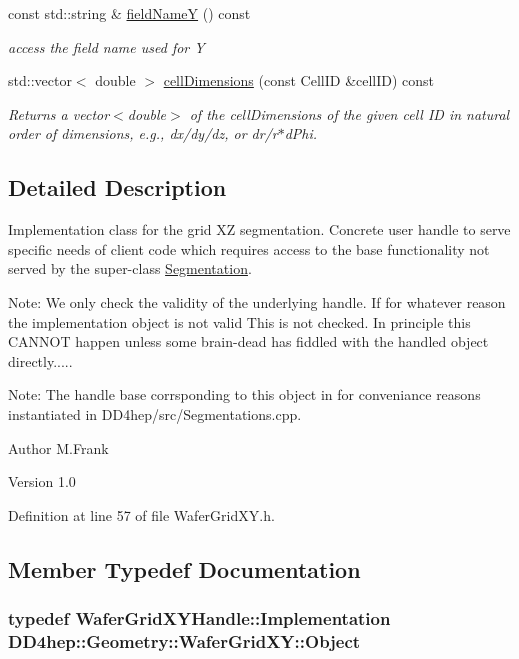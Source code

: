\begin{DoxyCompactItemize}
const std::string \& \hyperlink{class_d_d4hep_1_1_geometry_1_1_wafer_grid_x_y_a05aa07ed5eb1190b85a79d8cc27f8e89}{fieldNameY} () const 
\begin{DoxyCompactList}\small\item\em access the field name used for Y \item\end{DoxyCompactList}\item 
std::vector$<$ double $>$ \hyperlink{class_d_d4hep_1_1_geometry_1_1_wafer_grid_x_y_a6a03248b55e4fb3c5efd567b89c936cb}{cellDimensions} (const CellID \&cellID) const 
\begin{DoxyCompactList}\small\item\em Returns a vector$<$double$>$ of the cellDimensions of the given cell ID in natural order of dimensions, e.g., dx/dy/dz, or dr/r$\ast$dPhi. \item\end{DoxyCompactList}\end{DoxyCompactItemize}


\subsection{Detailed Description}
Implementation class for the grid XZ segmentation. Concrete user handle to serve specific needs of client code which requires access to the base functionality not served by the super-\/class \hyperlink{class_d_d4hep_1_1_geometry_1_1_segmentation}{Segmentation}.

Note: We only check the validity of the underlying handle. If for whatever reason the implementation object is not valid This is not checked. In principle this CANNOT happen unless some brain-\/dead has fiddled with the handled object directly.....

Note: The handle base corrsponding to this object in for conveniance reasons instantiated in DD4hep/src/Segmentations.cpp.

\begin{DoxyAuthor}{Author}
M.Frank 
\end{DoxyAuthor}
\begin{DoxyVersion}{Version}
1.0 
\end{DoxyVersion}


Definition at line 57 of file WaferGridXY.h.

\subsection{Member Typedef Documentation}
\hypertarget{class_d_d4hep_1_1_geometry_1_1_wafer_grid_x_y_a94a234312cc2c123569319d3d33b24e0}{
\subsubsection[{Object}]{\setlength{\rightskip}{0pt plus 5cm}typedef {\bf WaferGridXYHandle::Implementation} {\bf DD4hep::Geometry::WaferGridXY::Object}}}
\label{class_d_d4hep_1_1_geometry_1_1_wafer_grid_x_y_a94a234312cc2c123569319d3d33b24e0}


